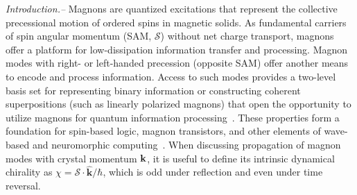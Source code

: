 \documentclass[
amsmath,amssymb,aps,showkeys, nofootinbib, twocolumn,superscriptaddress,longbibliography
]{revtex4-2}
\begin{document}
\begin{abstract}
    Magnons in ferromagnets possess spin angular momentum defined by right-handed precession of the moment around the magnetization direction.  In antiferromagnets with no net magnetization, left- and right-handed magnons are degenerate in the absence of an applied field. Ferrimagnets possess uncompensated magnetic sublattices, which should natively possess right-and left-handed magnons where their energy is split by the internal molecular field.  Here, we show that $R$Mn$_6$Sn$_6$ ($R =$ Tb, Er) ferrimagnets possess right and left-handed magnon bands that cross at finite momentum (${\bf k}$) within the basal plane, defining modes with opposite dynamical chirality.  Depending on the symmetry of the ferrimagnetic order, which may be manipulated by varying the rare-earth magnetic anisotropy or with applied field, the band crossing may remain a nodal line or may be gapped. The gapped modes contain hybridized chiral excitations whose chirality becomes {\bf k}-dependent.
\end{abstract}

\maketitle


{\it Introduction.--}
    Magnons are quantized excitations that represent the collective precessional motion of ordered spins in magnetic solids.  As fundamental carriers of spin angular momentum (SAM, $\boldsymbol{\mathcal{S}}$) without net charge transport, magnons offer a platform for low-dissipation information transfer and processing. Magnon modes with right- or left-handed precession (opposite SAM) offer another means to encode and process information. Access to such modes provides a two-level basis set for representing binary information or constructing coherent superpositions (such as linearly polarized magnons) that open the opportunity to utilize magnons for quantum information processing~\cite{Daniels18}.  These properties form a foundation for spin-based logic, magnon transistors, and other elements of wave-based and neuromorphic computing~\cite{Lenk11,Chumak15,Pirro21,Yuan22}. When discussing propagation of magnon modes with crystal momentum ${\bf k}$, it is useful to define its intrinsic dynamical chirality as $\chi = \boldsymbol{\mathcal{S}} \cdot \hat{\mathbf{k}}/\hbar$, which is odd under reflection and even under time reversal.
\end{document}
